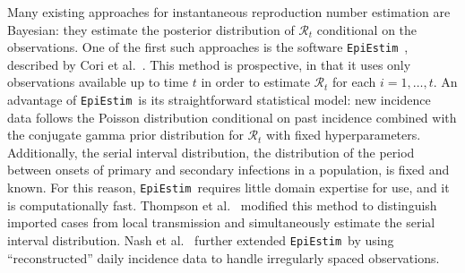 \documentclass[10pt,letterpaper]{article}
\def\EpiEstim{\texttt{EpiEstim}}
\def\calR{\mathcal{R}}
\begin{document}
Many existing approaches for instantaneous reproduction number estimation are
Bayesian: they estimate the posterior distribution of $\calR_t$ conditional on
the observations. One of the first such approaches is the software \EpiEstim\
\cite{cori2020package}, described by Cori et al.~\cite{cori2013new}. This method
is prospective, in that it uses only observations available up to time $t$ in
order to estimate $\calR_t$ for each $i = 1,\ldots, t$. An advantage of
\EpiEstim\ is its straightforward statistical model: new incidence data follows
the Poisson distribution conditional on past incidence combined with the
conjugate gamma prior distribution for $\calR_t$ with fixed hyperparameters.
Additionally, the serial interval distribution, the distribution of the period
between onsets of primary and secondary infections in a population, is fixed and
known. For this reason, \EpiEstim\ requires little domain expertise for use, and
it is computationally fast. Thompson et al.~\cite{thompson2019improved} modified
this method to distinguish imported cases from local transmission and
simultaneously estimate the serial interval distribution. Nash et
al.~\cite{nash2023estimating} further extended \EpiEstim\ by using
``reconstructed'' daily incidence data to handle irregularly spaced
observations. 
\end{document}
